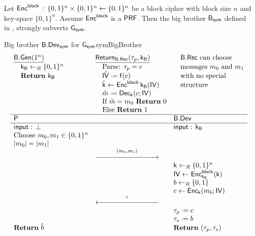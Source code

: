 \begin{thm}
Let $\operatorname{\mathsf{Enc}^{\mathsf{block}}}\,:\, \{0,1\}^n\times\{0,1\}^n\leftarrow \{0,1\}^n$ be a block cipher with block size $n$ and key-space $\{0,1\}^n$. Assume $\operatorname{\mathsf{Enc}^{\mathsf{block}}}$ is a $\mathsf{PRF}$. Then the big brother $\mathsf{B}_{\mathsf{sym}}$ defined in , strongly subverts $\operatorname{\mathsf{G}}_{\mathsf{sym}}$. 
\end{thm}

\begin{intGame}{Big brother $\mathsf{B}.\mathsf{Dev}_{\mathsf{sym}}$ for $\operatorname{\mathsf{G}}_{\mathsf{sym}}$}{symBigBrother}
\begin{align*}
\begin{array}{lll}
\underline{\bbgen(1^n)} & \underline{\return_{\bbrec}(\ptrans,\bbk)} &  \quad\mbox{$\bbrec$ can choose} \\
\quad\bbk\unileft\{0,1\}^n & \quad\mbox{Parse: } \ptrans = c & \quad\mbox{messages $m_0$ and $m_1$} \\
\quad\mbox{\Ret } \bbk	&	\quad\hat{\iv} \defeq \f(c) & \quad\mbox{with no special} \\
	&	\quad\hat{\key} \leftarrow \EncBlock{\bbk}(\iv) & \quad\mbox{structure}\\
	&	\quad\hat{m} \defeq \dec_{\key}(c;\iv) & \\
	&	\quad\mbox{If } \hat{m} = m_0 \mbox{ \Ret } 0 &\\
	&	\quad\mbox{Else \Ret } 1 & \\
\hline \party &  & \bbdev \\ 
\hline \I: \, \bot &  & \I:\,\bbk \\
\mbox{Choose } m_0,m_1\in\{0,1\}^n & & \\
\vert m_0\vert = \vert m_1\vert & & \\
 & \longrightar{(m_0,m_1)}{3} & \\
 & & \key\unileft\{0,1\}^n \\
 & & \iv \leftarrow \Enc{\bbk}(\key) \\
 & & b\unileft\{0,1\} \\
 & & c \leftarrow \enc_{\key}(m_b;\iv) \\
 & \longleftar{c}{3} & \\
 & & \ptrans \defeq c \\
 & & \strans \defeq b \\
\Ret \hat{b} & & \Ret (\ptrans,\strans) \\
\end{array}   
\end{align*}
\end{intGame}

